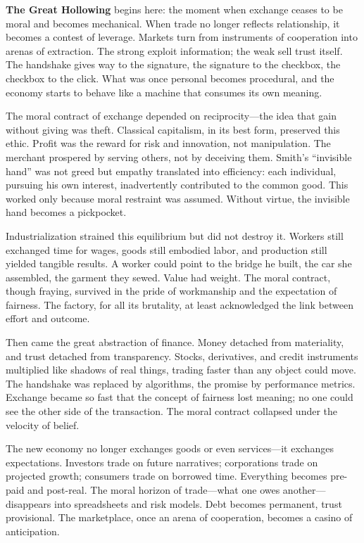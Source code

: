 \documentclass[11pt,twoside]{book}
\begin{document}
\textbf{The Great Hollowing} begins here: the moment when exchange ceases to be moral and becomes mechanical.  When trade no longer reflects relationship, it becomes a contest of leverage.  Markets turn from instruments of cooperation into arenas of extraction.  The strong exploit information; the weak sell trust itself.  The handshake gives way to the signature, the signature to the checkbox, the checkbox to the click.  What was once personal becomes procedural, and the economy starts to behave like a machine that consumes its own meaning.

The moral contract of exchange depended on reciprocity—the idea that gain without giving was theft.  Classical capitalism, in its best form, preserved this ethic.  Profit was the reward for risk and innovation, not manipulation.  The merchant prospered by serving others, not by deceiving them.  Smith’s “invisible hand” was not greed but empathy translated into efficiency: each individual, pursuing his own interest, inadvertently contributed to the common good.  This worked only because moral restraint was assumed.  Without virtue, the invisible hand becomes a pickpocket.

Industrialization strained this equilibrium but did not destroy it.  Workers still exchanged time for wages, goods still embodied labor, and production still yielded tangible results.  A worker could point to the bridge he built, the car she assembled, the garment they sewed.  Value had weight.  The moral contract, though fraying, survived in the pride of workmanship and the expectation of fairness.  The factory, for all its brutality, at least acknowledged the link between effort and outcome.

Then came the great abstraction of finance.  Money detached from materiality, and trust detached from transparency.  Stocks, derivatives, and credit instruments multiplied like shadows of real things, trading faster than any object could move.  The handshake was replaced by algorithms, the promise by performance metrics.  Exchange became so fast that the concept of fairness lost meaning; no one could see the other side of the transaction.  The moral contract collapsed under the velocity of belief.

The new economy no longer exchanges goods or even services—it exchanges expectations.  Investors trade on future narratives; corporations trade on projected growth; consumers trade on borrowed time.  Everything becomes pre-paid and post-real.  The moral horizon of trade—what one owes another—disappears into spreadsheets and risk models.  Debt becomes permanent, trust provisional.  The marketplace, once an arena of cooperation, becomes a casino of anticipation.
\end{document}
